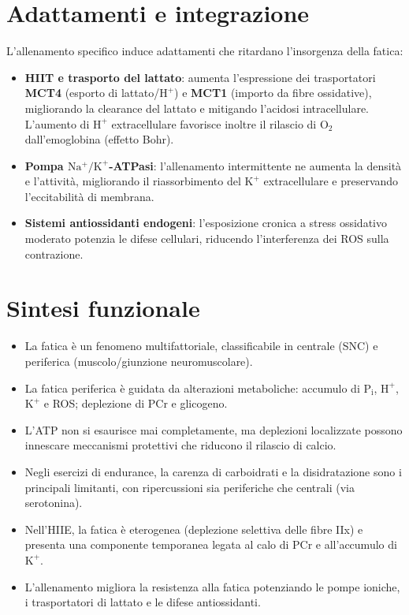 \documentclass[12pt,a4paper]{report}
\begin{document}
\section{Adattamenti e integrazione}
L'allenamento specifico induce adattamenti che ritardano l'insorgenza della fatica:
\begin{itemize}
\item \textbf{HIIT e trasporto del lattato}: aumenta l'espressione dei trasportatori \textbf{MCT4} (esporto di lattato/\(\mathrm{H^+}\)) e \textbf{MCT1} (importo da fibre ossidative), migliorando la clearance del lattato e mitigando l'acidosi intracellulare. L'aumento di \(\mathrm{H^+}\) extracellulare favorisce inoltre il rilascio di \(\mathrm{O_2}\) dall'emoglobina (effetto Bohr).
\item \textbf{Pompa \(\mathrm{Na^+/K^+}\)-ATPasi}: l'allenamento intermittente ne aumenta la densità e l'attività, migliorando il riassorbimento del \(\mathrm{K^+}\) extracellulare e preservando l'eccitabilità di membrana.
\item \textbf{Sistemi antiossidanti endogeni}: l'esposizione cronica a stress ossidativo moderato potenzia le difese cellulari, riducendo l'interferenza dei ROS sulla contrazione.
\end{itemize}

\section{Sintesi funzionale}
\begin{itemize}
\item La fatica è un fenomeno multifattoriale, classificabile in centrale (SNC) e periferica (muscolo/giunzione neuromuscolare).
\item La fatica periferica è guidata da alterazioni metaboliche: accumulo di \(\mathrm{P_i}\), \(\mathrm{H^+}\), \(\mathrm{K^+}\) e ROS; deplezione di PCr e glicogeno.
\item L'ATP non si esaurisce mai completamente, ma deplezioni localizzate possono innescare meccanismi protettivi che riducono il rilascio di calcio.
\item Negli esercizi di endurance, la carenza di carboidrati e la disidratazione sono i principali limitanti, con ripercussioni sia periferiche che centrali (via serotonina).
\item Nell'HIIE, la fatica è eterogenea (deplezione selettiva delle fibre IIx) e presenta una componente temporanea legata al calo di PCr e all'accumulo di \(\mathrm{K^+}\).
\item L'allenamento migliora la resistenza alla fatica potenziando le pompe ioniche, i trasportatori di lattato e le difese antiossidanti.
\end{itemize}

\end{document}
